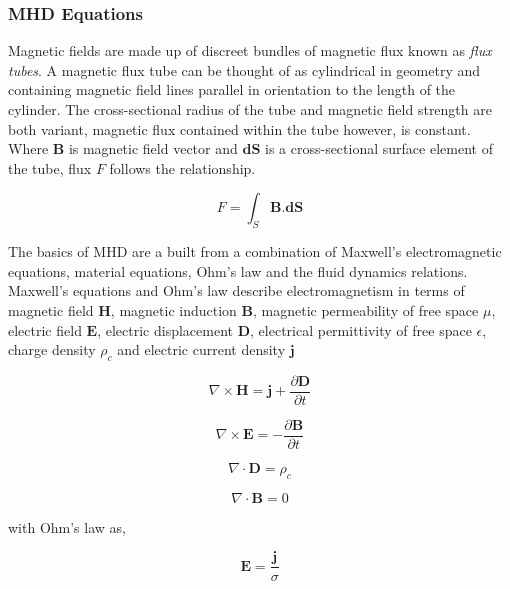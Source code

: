 \documentclass[11pt]{article}
\renewcommand{\vec}[1]{\mathbf{#1}}
\begin{document}
\subsubsection{MHD Equations}\label{MHDeqns}
Magnetic fields are made up of discreet bundles of magnetic flux known as \emph{flux tubes}. A magnetic flux tube can be thought of as cylindrical in geometry and containing magnetic field lines parallel in orientation to the length of the cylinder. The cross-sectional radius of the tube and magnetic field strength are both variant, magnetic flux contained within the tube however, is constant. Where $\vec{B}$ is magnetic field vector and $\vec{dS}$ is a cross-sectional surface element of the tube, flux $F$ follows the relationship.

\begin{equation}\label{fluxtube}       
F = \int_{S} \vec{B}.\vec{dS}
\end{equation}


The basics of MHD are a built from a combination of Maxwell's electromagnetic equations, material equations, Ohm's law and the fluid dynamics relations. Maxwell's equations and Ohm's law describe electromagnetism in terms of magnetic field $\vec{H}$, magnetic induction $\vec{B}$, magnetic permeability of free space $\mu$, electric field $\vec{E}$, electric displacement $\vec{D}$, electrical permittivity of free space $\epsilon$, charge density $\rho_{c}$ and electric current density $\vec{j}$ 


\begin{equation}\label{max1:ampere}
\nabla\times\vec{H}=\vec{j}+\frac{\partial \vec{D}}{\partial t}
\end{equation}


\begin{equation}\label{max2:faraday}
\nabla\times\vec{E}=-\frac{\partial \vec{B}}{\partial t}
\end{equation}


\begin{equation}\label{max3:gauss}
\nabla\cdot\vec{D}=\rho_{c}
\end{equation}


\begin{equation}\label{max4:nomonopole}
\nabla\cdot\vec{B}=0
\end{equation}

with Ohm's law as,

\begin{equation}\label{ohmslaw}
\vec{E}=\frac{\vec{j}}{\sigma}
\end{equation}
\end{document}
